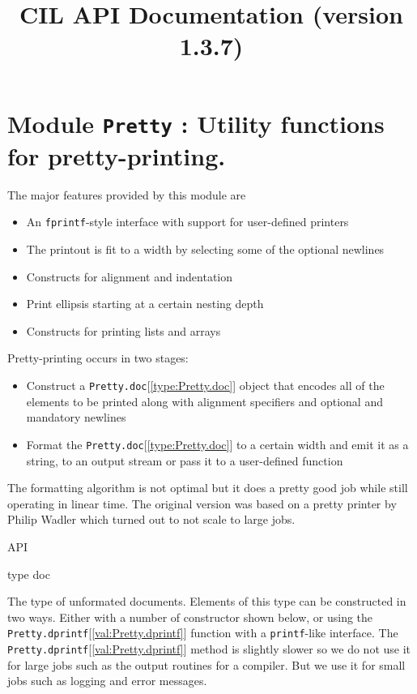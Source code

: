 \documentclass[11pt]{article}
\title{CIL API Documentation (version 1.3.7)}
\begin{document}
\maketitle
\tableofcontents
\section{Module {\tt{Pretty}} : Utility functions for pretty-printing.}
\label{module:Pretty}
 The major features provided by 
    this module are \begin{itemize}
\item An {\tt{fprintf}}-style interface with support for user-defined printers
\item The printout is fit to a width by selecting some of the optional newlines
\item Constructs for alignment and indentation
\item Print ellipsis starting at a certain nesting depth
\item Constructs for printing lists and arrays
\end{itemize}

 Pretty-printing occurs in two stages:\begin{itemize}
\item Construct a {\tt{Pretty.doc}}[\ref{type:Pretty.doc}] object that encodes all of the elements to be 
  printed 
  along with alignment specifiers and optional and mandatory newlines
\item Format the {\tt{Pretty.doc}}[\ref{type:Pretty.doc}] to a certain width and emit it as a string, to an 
  output stream or pass it to a user-defined function
\end{itemize}

 The formatting algorithm is not optimal but it does a pretty good job while 
 still operating in linear time. The original version was based on a pretty 
 printer by Philip Wadler which turned out to not scale to large jobs.



\ocamldocvspace{0.5cm}



API



\label{type:Pretty.doc}\begin{ocamldoccode}
type doc 
\end{ocamldoccode}
\begin{ocamldocdescription}
The type of unformated documents. Elements of this type can be 
 constructed in two ways. Either with a number of constructor shown below, 
 or using the {\tt{Pretty.dprintf}}[\ref{val:Pretty.dprintf}] function with a {\tt{printf}}-like interface. 
 The {\tt{Pretty.dprintf}}[\ref{val:Pretty.dprintf}] method is slightly slower so we do not use it for 
 large jobs such as the output routines for a compiler. But we use it for 
 small jobs such as logging and error messages.


\end{ocamldocdescription}
\end{document}
